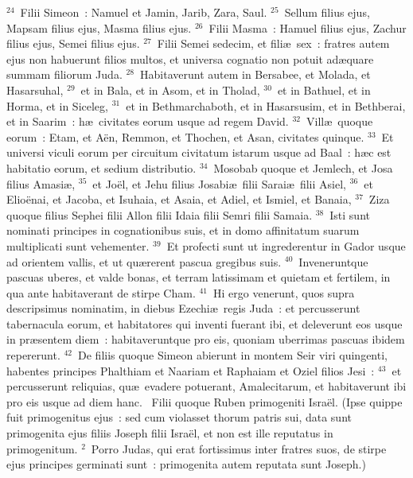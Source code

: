 ${}^{24}$~Filii Simeon~: Namuel et Jamin, Jarib, Zara, Saul.
${}^{25}$~Sellum filius ejus, Mapsam filius ejus, Masma filius ejus.
${}^{26}$~Filii Masma~: Hamuel filius ejus, Zachur filius ejus, Semei filius ejus.
${}^{27}$~Filii Semei sedecim, et fili\ae\ sex~: fratres autem ejus non habuerunt filios multos, et universa cognatio non potuit ad\ae quare summam filiorum Juda.
${}^{28}$~Habitaverunt autem in Bersabee, et Molada, et Hasarsuhal,
${}^{29}$~et in Bala, et in Asom, et in Tholad,
${}^{30}$~et in Bathuel, et in Horma, et in Siceleg,
${}^{31}$~et in Bethmarchaboth, et in Hasarsusim, et in Bethberai, et in Saarim~: h\ae\ civitates eorum usque ad regem David.
${}^{32}$~Vill\ae\ quoque eorum~: Etam, et A\"en, Remmon, et Thochen, et Asan, civitates quinque.
${}^{33}$~Et universi viculi eorum per circuitum civitatum istarum usque ad Baal~: h\ae c est habitatio eorum, et sedium distributio.
${}^{34}$~Mosobab quoque et Jemlech, et Josa filius Amasi\ae ,
${}^{35}$~et Jo\"el, et Jehu filius Josabi\ae\ filii Sarai\ae\ filii Asiel,
${}^{36}$~et Elio\"enai, et Jacoba, et Isuhaia, et Asaia, et Adiel, et Ismiel, et Banaia,
${}^{37}$~Ziza quoque filius Sephei filii Allon filii Idaia filii Semri filii Samaia.
${}^{38}$~Isti sunt nominati principes in cognationibus suis, et in domo affinitatum suarum multiplicati sunt vehementer.
${}^{39}$~Et profecti sunt ut ingrederentur in Gador usque ad orientem vallis, et ut qu\ae rerent pascua gregibus suis.
${}^{40}$~Inveneruntque pascuas uberes, et valde bonas, et terram latissimam et quietam et fertilem, in qua ante habitaverant de stirpe Cham.
${}^{41}$~Hi ergo venerunt, quos supra descripsimus nominatim, in diebus Ezechi\ae\ regis Juda~: et percusserunt tabernacula eorum, et habitatores qui inventi fuerant ibi, et deleverunt eos usque in pr\ae sentem diem~: habitaveruntque pro eis, quoniam uberrimas pascuas ibidem repererunt.
${}^{42}$~De filiis quoque Simeon abierunt in montem Seir viri quingenti, habentes principes Phalthiam et Naariam et Raphaiam et Oziel filios Jesi~:
${}^{43}$~et percusserunt reliquias, qu\ae\ evadere potuerant, Amalecitarum, et habitaverunt ibi pro eis usque ad diem hanc.
~\lettrine[lines=10,image=true,loversize=0.05,lraise=-0.03]{F}{}ilii quoque Ruben primogeniti Isra\"el. (Ipse quippe fuit primogenitus ejus~: sed cum violasset thorum patris sui, data sunt primogenita ejus filiis Joseph filii Isra\"el, et non est ille reputatus in primogenitum.
${}^{2}$~Porro Judas, qui erat fortissimus inter fratres suos, de stirpe ejus principes germinati sunt~: primogenita autem reputata sunt Joseph.)
